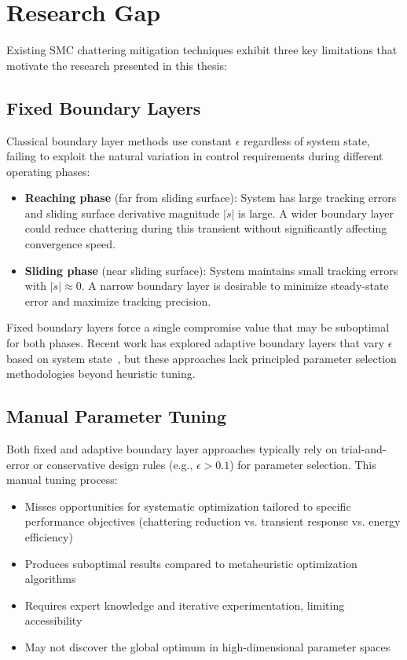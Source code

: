 \documentclass[12pt,a4paper,oneside]{report}
\begin{document}
\section{Research Gap}

Existing SMC chattering mitigation techniques exhibit three key limitations that motivate the research presented in this thesis:

\subsection{Fixed Boundary Layers}

Classical boundary layer methods use constant $\epsilon$ regardless of system state, failing to exploit the natural variation in control requirements during different operating phases:

\begin{itemize}
\item \textbf{Reaching phase} (far from sliding surface): System has large tracking errors and sliding surface derivative magnitude $|\dot{s}|$ is large. A wider boundary layer could reduce chattering during this transient without significantly affecting convergence speed.

\item \textbf{Sliding phase} (near sliding surface): System maintains small tracking errors with $|\dot{s}| \approx 0$. A narrow boundary layer is desirable to minimize steady-state error and maximize tracking precision.
\end{itemize}

Fixed boundary layers force a single compromise value that may be suboptimal for both phases. Recent work has explored adaptive boundary layers that vary $\epsilon$ based on system state~\cite{ieee2018selfreg}, but these approaches lack principled parameter selection methodologies beyond heuristic tuning.

\subsection{Manual Parameter Tuning}

Both fixed and adaptive boundary layer approaches typically rely on trial-and-error or conservative design rules (e.g., $\epsilon > 0.1$) for parameter selection. This manual tuning process:

\begin{itemize}
\item Misses opportunities for systematic optimization tailored to specific performance objectives (chattering reduction vs. transient response vs. energy efficiency)
\item Produces suboptimal results compared to metaheuristic optimization algorithms
\item Requires expert knowledge and iterative experimentation, limiting accessibility
\item May not discover the global optimum in high-dimensional parameter spaces
\end{itemize}
\end{document}
